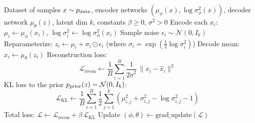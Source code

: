 \begin{algorithm}[ht]
\caption{$\beta$-VAE Training Procedure (Gaussian decoder with fixed variance $p_\theta(x|z)=\mathcal{N}(x;\mu_\theta(z),\tilde{\sigma}^2 I_d)$)}
\label{alg:vae_training}
\begin{algorithmic}[1]
\REQUIRE Dataset of samples $x\sim p_{\rm{data}}$, encoder networks $(\mu_\phi(x), \log\sigma_\phi^2(x))$, decoder network $\mu_\theta(z)$, latent dim $k$, constants $\beta\ge 0$, $\sigma^2>0$
    \STATE Encode each $x_i$: $\mu_i \gets \mu_\phi(x_i)$,\;\; $\log\sigma_i^2 \gets \log\sigma_\phi^2(x_i)$
    \STATE Sample noise $\epsilon_i \sim \mathcal{N}(0,I_k)$
    \STATE Reparameterize: $z_i \gets \mu_i + \sigma_i \odot \epsilon_i$ \hfill (where $\sigma_i=\exp(\tfrac12 \log\sigma_i^2)$)
    \STATE Decode mean: $\hat{x}_i \gets \mu_\theta(z_i)$
    \STATE Reconstruction loss:
    \[
        \mathcal{L}_{\text{recon}} \gets \frac{1}{B}\sum_{i=1}^B \frac{1}{2\tilde{\sigma}^2}\,\|x_i-\hat{x}_i\|^2
    \]
    \STATE KL loss to the prior $p_{\text{prior}}(z)=\mathcal{N}(0,I_k)$:
    \[
        \mathcal{L}_{\text{KL}} \gets \frac{1}{B}\sum_{i=1}^B \frac12 \sum_{j=1}^k \left(\mu_{i,j}^2 + \sigma_{i,j}^2 - \log \sigma_{i,j}^2 - 1\right)
    \]
    \STATE Total loss: $\mathcal{L}\gets \mathcal{L}_{\text{recon}} + \beta\,\mathcal{L}_{\text{KL}}$
    \STATE Update $(\phi,\theta)\gets \text{grad\_update}(\mathcal{L})$
\ENDFOR
\end{algorithmic}
\end{algorithm}




